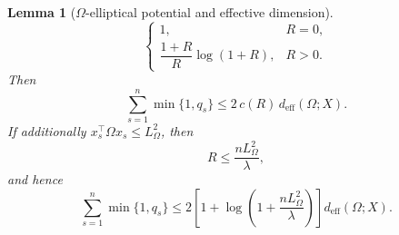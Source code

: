 \documentclass{article} %
\newtheorem{lemma}[theorem]{Lemma}
\begin{document}
\begin{lemma}[\(\Omega\)-elliptical potential and effective dimension]
\begin{equation}
\begin{cases}
1, & R=0,\\[2mm]
\dfrac{1+R}{R}\log(1+R), & R>0 .
\end{cases}
\end{equation}
Then
\begin{equation}
\label{eq:hyper-elliptical-main}
\sum_{s=1}^n \min\{1,q_s\}
\le
2\,c(R)\,d_{\mathrm{eff}}(\Omega;X).
\end{equation}
If additionally \(x_s^\top\Omega x_s\le L_{\Omega}^2\), then
\begin{equation}
\label{eq:hyper-elliptical-radius}
R\le \frac{nL_{\Omega}^2}{\lambda},
\end{equation}
and hence
\begin{equation}
\label{eq:hyper-elliptical-logT}
\sum_{s=1}^n \min\{1,q_s\}
\le
2
\left[
1+
\log\!\left(1+\frac{nL_{\Omega}^2}{\lambda}\right)
\right]
d_{\mathrm{eff}}(\Omega;X).
\end{equation}
\end{lemma}
\end{document}
